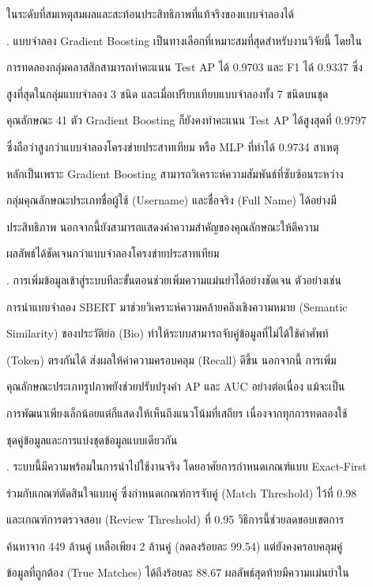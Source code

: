 \documentclass[12pt,a4paper]{report}
\begin{document}
ในระดับที่สมเหตุสมผลและสะท้อนประสิทธิภาพที่แท้จริงของแบบจำลองได้\par
\clearpage
{}. แบบจำลอง Gradient Boosting เป็นทางเลือกที่เหมาะสมที่สุดสำหรับงานวิจัยนี้ โดยใน\par
การทดลองกลุ่มคลาสสิกสามารถทำคะแนน Test AP ได้ 0.9703 และ F1 ได้ 0.9337 ซึ่ง\par
สูงที่สุดในกลุ่มแบบจำลอง 3 ชนิด และเมื่อเปรียบเทียบแบบจำลองทั้ง 7 ชนิดบนชุด\par
คุณลักษณะ 41 ตัว Gradient Boosting ก็ยังคงทำคะแนน Test AP ได้สูงสุดที่ 0.9797\par
ซึ่งถือว่าสูงกว่าแบบจำลองโครงข่ายประสาทเทียม หรือ MLP ที่ทำได้ 0.9734 สาเหตุ\par
หลักเป็นเพราะ Gradient Boosting สามารถวิเคราะห์ความสัมพันธ์ที่ซับซ้อนระหว่าง\par
กลุ่มคุณลักษณะประเภทชื่อผู้ใช้ (Username) และชื่อจริง (Full Name) ได้อย่างมี\par
ประสิทธิภาพ นอกจากนี้ยังสามารถแสดงค่าความสำคัญของคุณลักษณะให้ตีความ\par
ผลลัพธ์ได้ชัดเจนกว่าแบบจำลองโครงข่ายประสาทเทียม\par
{}. การเพิ่มข้อมูลเข้าสู่ระบบทีละขั้นตอนช่วยเพิ่มความแม่นยำได้อย่างชัดเจน ตัวอย่างเช่น\par
การนำแบบจำลอง SBERT มาช่วยวิเคราะห์ความคล้ายคลึงเชิงความหมาย (Semantic\par
Similarity) ของประวัติย่อ (Bio) ทำให้ระบบสามารถจับคู่ข้อมูลที่ไม่ได้ใช้คำศัพท์\par
(Token) ตรงกันได้ ส่งผลให้ค่าความครอบคลุม (Recall) ดีขึ้น นอกจากนี้ การเพิ่ม\par
คุณลักษณะประเภทรูปภาพยังช่วยปรับปรุงค่า AP และ AUC อย่างต่อเนื่อง แม้จะเป็น\par
การพัฒนาเพียงเล็กน้อยแต่ก็แสดงให้เห็นถึงแนวโน้มที่เสถียร เนื่องจากทุกการทดลองใช้\par
ชุดคู่ข้อมูลและการแบ่งชุดข้อมูลแบบเดียวกัน\par
{}. ระบบนี้มีความพร้อมในการนำไปใช้งานจริง โดยอาศัยการกำหนดเกณฑ์แบบ Exact-First\par
ร่วมกับเกณฑ์ตัดสินใจแบบคู่ ซึ่งกำหนดเกณฑ์การจับคู่ (Match Threshold) ไว้ที่ 0.98\par
และเกณฑ์การตรวจสอบ (Review Threshold) ที่ 0.95 วิธีการนี้ช่วยลดขอบเขตการ\par
ค้นหาจาก 449 ล้านคู่ เหลือเพียง 2 ล้านคู่ (ลดลงร้อยละ 99.54) แต่ยังคงครอบคลุมคู่\par
ข้อมูลที่ถูกต้อง (True Matches) ได้ถึงร้อยละ 88.67 ผลลัพธ์สุดท้ายมีความแม่นยำใน\par
\end{document}
